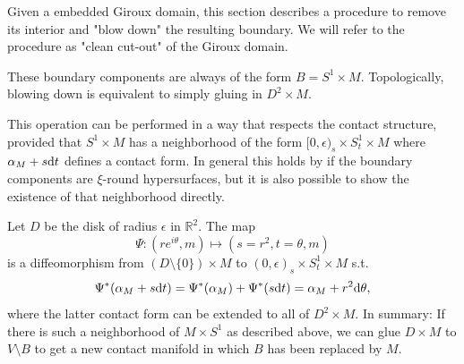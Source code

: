 Given a embedded Giroux domain, this section describes a procedure
to remove its interior and "blow down" the resulting boundary.
We will refer to the procedure as "clean cut-out" of the Giroux domain.

These boundary components are always of the form $B = S^1 \times M$.
Topologically, blowing down is equivalent to simply gluing in $D^2 \times M$.

This operation can be performed in a way that respects the contact structure,
provided that $S^1 \times M$ has a neighborhood
of the form $[0, \epsilon)_s \times S^1_t \times M$ where $\alpha_M + s \mathrm{d} t$
defines a contact form.
In general this holds by \cite[Lemma 5.1]{MNW13} if the boundary components 
are $\xi$-round hypersurfaces, but it is also possible to show the existence 
of that neighborhood directly.

Let $D$ be the disk of radius $\epsilon$ in $\mathbb R^2$. The map 
\[
    \Psi \colon (re^{i\theta} , m) \mapsto (s = r^2, t = \theta, m)
\]
is a diffeomorphism from $(D \setminus \{0\}) \times M$ to 
$(0, \epsilon)_s \times S^1_t \times M$ s.t.
\[
    \Psi^*(\alpha_M + s \mathrm{d} t) = \Psi^*(\alpha_M) + \Psi^*(s\mathrm{d} t) 
    = \alpha_M + r^2 \mathrm{d} \theta,
\]
where the latter contact form can be extended to all of $D^2 \times M$.
In summary: If there is such a neighborhood of $M \times S^1$ as described above, 
we can glue $D \times M$ to $V \setminus B$ to get a new contact manifold 
in which $B$ has been replaced by $M$.


